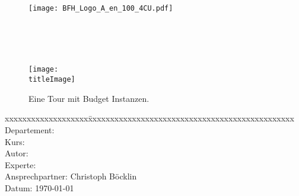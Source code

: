 \thispagestyle{empty}

\begin{figure}
	\texttt{[image: BFH\_Logo\_A\_en\_100\_4CU.pdf]}
\end{figure}


\begin{minipage}[c][3cm][c]{\linewidth} {
	\centering
	\vspace*{2cm}
	{\fontsize{24pt}{0pt}\selectfont \textbf{\doctitle}}  \\
	\vspace*{0.6cm}
	{\fontsize{20pt}{0pt}\selectfont {Geodatenverarbeitung\\ mit Budget Instanzen}}  \\
	\vspace*{1cm}
	{\fontsize{14pt}{0pt}\selectfont \doctype}  \\
}
\end{minipage}


\vspace{1.5cm}


\begin{figure}[H]
	\centering
	\makebox[1.0\linewidth]{\color{BFHGray} \rule{1.0\linewidth}{10pt}}
	\texttt{[image: \\titleImage]}
	\makebox[1.0\linewidth]{\color{BFHGray} \rule{1.0\linewidth}{10pt}}
    \caption{Eine Tour mit Budget Instanzen\space\cite{HippieCar:1}.}
\end{figure}

\vfill

\begin{minipage}[c][3cm][c]{\linewidth}
{
	\centering
	\begin{tabbing}
		xxxxxxxxxxxxxxxxxxx\=xxxxxxxxxxxxxxxxxxxxxxxxxxxxxxxxxxxxxxxxxxxxxxx \kill
		Departement:	\> \fieldofstudies \\
		Kurs:			\> \course \\
		Autor:		\> \docauthor \\%
		Experte:		\> \prof \\
		Ansprechpartner:      \> Christoph Böcklin \\
		Datum:			\> \today \\
	\end{tabbing}
}
\end{minipage}

\pagebreak
